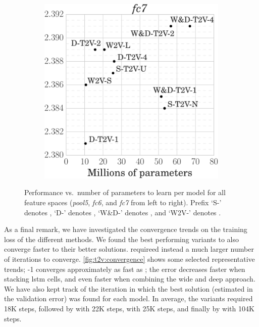 \begin{figure}
\begin{subfigure}{.31\linewidth}
\end{subfigure}%
\hfill
\begin{subfigure}{.31\linewidth}
\includegraphics[width=\linewidth]{performance-size-fc7}
\end{subfigure}
\caption{Performance vs.\ number of parameters to learn per model for all feature spaces (\emph{pool5}, \emph{fc6}, and \emph{fc7} from left to right).
Prefix `S-' denotes \sparsettv{}, `D-' denotes \densettv{}, `W\&D-' denotes \widedeepttv{}, and `W2V-' denotes \wordvisual{}.
}
\label{fig:t2v:performance-size}
\end{figure}

As a final remark, we have investigated the convergence trends on the training loss of the different methods.
We found the best performing \ttv{} variants to also converge faster to their better solutions.
\wordvisual{} requireed instead a much larger number of iterations to converge.
\ref{fig:t2v:convergence} shows some selected representative trends;
\densettv{}-1 converges approximately as fast as \sparsettv{};
the error decreases faster when stacking \gls{lstm} cells, and even faster when combining the wide and deep approach.
We have also kept track of the iteration in which the best solution (estimated in the validation error) was found for each model.
In average, the \widedeepttv{} variants required 18K steps, followed by \densettv{} with 22K steps, \sparsettv{} with 25K steps, and finally by \wordvisual{} with 104K steps.

